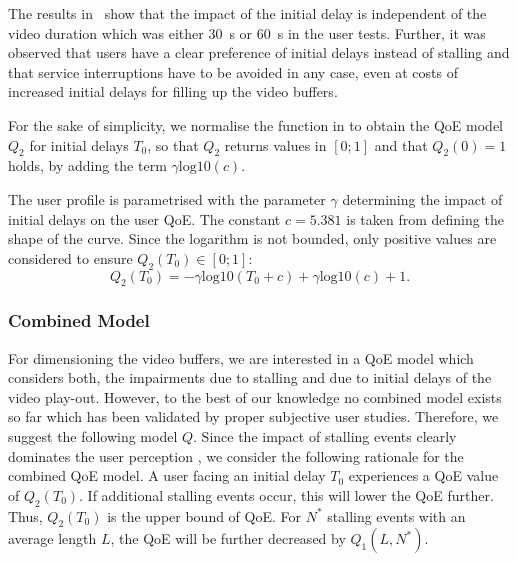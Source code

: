 The results in~\cite{Hossfeld2012c} show that the impact of the initial delay is independent of the video duration which was either \SI{30}{\second} or \SI{60}{\second} in the user tests.
Further, it was observed that users have a clear preference of initial delays instead
of stalling and that service interruptions have to be avoided in any case, even at costs of increased initial delays for filling up the video buffers. 

For the sake of simplicity, we normalise the function in  to obtain the \gls{QoE} model \(Q_2\) for initial delays \(T_0\), so that \(Q_2\) returns values in \(\left[0;1\right]\) and that \(Q_2(0)=1\) holds, by adding the term \(\gamma \mathrm{log10}\left(c\right)\).

The user profile is parametrised with the parameter \(\gamma\) determining the impact of initial delays on the user \gls{QoE}.
The constant \(c=5.381\) is taken from  defining the shape of the curve. 
Since the logarithm is not bounded, only positive values are considered to ensure \(Q_2(T_0) \in [0;1]\):
\begin{equation*}
Q_2(T_0)= -\gamma \mathrm{log10}\left(T_0 + c\right) + \gamma \mathrm{log10}\left(c\right)+ 1.
\end{equation*}

\subsubsection*{Combined  Model}\label{sec:application:qoe_user_behaviour:typical_user_scenarios:youtube_qoe:combined}
For dimensioning the video buffers, we are interested in a \gls{QoE} model which considers both, the impairments due to stalling and due to initial delays of the video play-out.
However, to the best of our knowledge no combined model exists so far which has been validated by proper subjective user studies.
Therefore, we suggest the following model \(Q\).
Since the impact of stalling events clearly dominates the user perception \cite{Hossfeld2012a,Hossfeld2012c}, we consider the following rationale for the combined QoE model.
A user facing an initial delay \(T_0\) experiences a \gls{QoE} value of \(Q_2(T_0)\).
If additional stalling events occur, this will lower the QoE further.
Thus, \(Q_2(T_0)\) is the upper bound of \gls{QoE}.
For \(N^*\) stalling events with an average length \(L\), the \gls{QoE} will be further decreased by \(Q_1(L,N^*)\).

